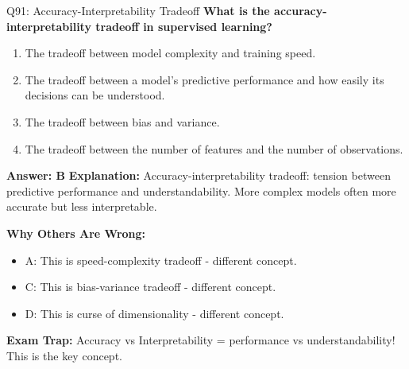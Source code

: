 \documentclass[8pt]{beamer}
\begin{document}
	\begin{frame}{Q91: Accuracy-Interpretability Tradeoff}
		\fontsize{6.5}{7.5}\selectfont
		\textbf{What is the accuracy-interpretability tradeoff in supervised learning?}
		
		\begin{enumerate}
			\item The tradeoff between model complexity and training speed.
			\item The tradeoff between a model's predictive performance and how easily its decisions can be understood.
			\item The tradeoff between bias and variance.
			\item The tradeoff between the number of features and the number of observations.
		\end{enumerate}
		
		\vspace{0.05cm}
		\textcolor{myblue}{\textbf{Answer: B}}
		\vspace{0.05cm}
		\textcolor{myblue}{\textbf{Explanation:}} Accuracy-interpretability tradeoff: tension between predictive performance and understandability. More complex models often more accurate but less interpretable.
		
		\vspace{0.05cm}
		\textcolor{myred}{\textbf{Why Others Are Wrong:}}
		\begin{itemize}
			\item \textcolor{myred}{A:} This is speed-complexity tradeoff - different concept.
			\item \textcolor{myred}{C:} This is bias-variance tradeoff - different concept.
			\item \textcolor{myred}{D:} This is curse of dimensionality - different concept.
		\end{itemize}
		
		\textcolor{myred}{\textbf{Exam Trap:}} Accuracy vs Interpretability = \textcolor{myblue}{performance vs understandability}! This is the key concept.
	\end{frame}
	
\end{document}
